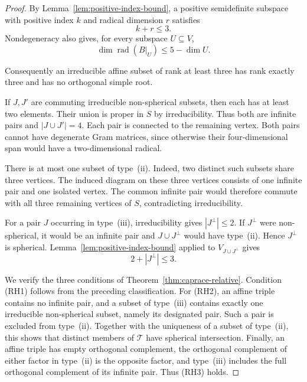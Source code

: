 \documentclass[11pt,reqno]{amsart}
\theoremstyle{plain}
\theoremstyle{definition}
\theoremstyle{remark}
\numberwithin{equation}{section}
\begin{document}
\begin{proof}
By Lemma~\ref{lem:positive-index-bound}, a positive semidefinite
subspace with positive index $k$ and radical dimension $r$ satisfies
\[
    k+r\leq3.
\]
Nondegeneracy also gives, for every subspace $U\subseteq V$,
\[
    \dim\operatorname{rad}(B|_U)\leq5-\dim U.
\]

Consequently an irreducible affine subset of rank at least
three has rank exactly three and has no orthogonal simple
root.

If $J,J'$ are commuting irreducible non-spherical subsets,
then each has at least two elements.
Their union is proper in $S$ by irreducibility.
Thus both are infinite pairs and $|J\cup J'|=4$.
Each pair is connected to the remaining vertex.
Both pairs cannot have degenerate Gram matrices, since
otherwise their four-dimensional span would have a
two-dimensional radical.

There is at most one subset of type~\textup{(ii)}.
Indeed, two distinct such subsets share three vertices.
The induced diagram on these three vertices consists of
one infinite pair and one isolated vertex.
The common infinite pair would therefore commute with
all three remaining vertices of $S$, contradicting
irreducibility.

For a pair $J$ occurring in type~\textup{(iii)},
irreducibility gives $|J^\perp|\leq2$.
If $J^\perp$ were non-spherical, it would be an infinite
pair and $J\cup J^\perp$ would have type~\textup{(ii)}.
Hence $J^\perp$ is spherical.
Lemma~\ref{lem:positive-index-bound} applied to $V_{J\cup J^\perp}$
gives
\[
    2+|J^\perp|\leq3.
\]

We verify the three conditions of Theorem~\ref{thm:caprace-relative}.
Condition \textup{(RH1)} follows from the preceding
classification.
For \textup{(RH2)}, an affine triple contains no infinite
pair, and a subset of type~\textup{(iii)} contains exactly
one irreducible non-spherical subset, namely its designated
pair.
Such a pair is excluded from type~\textup{(ii)}.
Together with the uniqueness of a subset of
type~\textup{(ii)}, this shows that distinct members of
$\mathcal T$ have spherical intersection.
Finally, an affine triple has empty orthogonal complement,
the orthogonal complement of either factor in
type~\textup{(ii)} is the opposite factor, and
type~\textup{(iii)} includes the full orthogonal complement
of its infinite pair.
Thus \textup{(RH3)} holds.
\end{proof}
\end{document}
